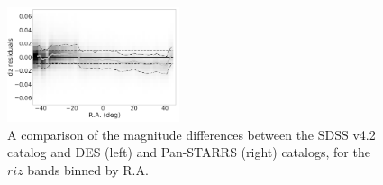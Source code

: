\documentclass[fleqn,usenatbib]{mnras}
\begin{document}
\begin{figure}
    \centering\includegraphics[width=0.45\textwidth]{figures/colorResidPSDR2v42bright_dz_RA_Hess_lr.png}
\caption{A comparison of the magnitude differences between the SDSS v4.2 catalog
and DES (left) and Pan-STARRS (right) catalogs, for the $riz$ bands binned by R.A.}
\label{fig:DESPSRA}
\end{figure}
\end{document}
